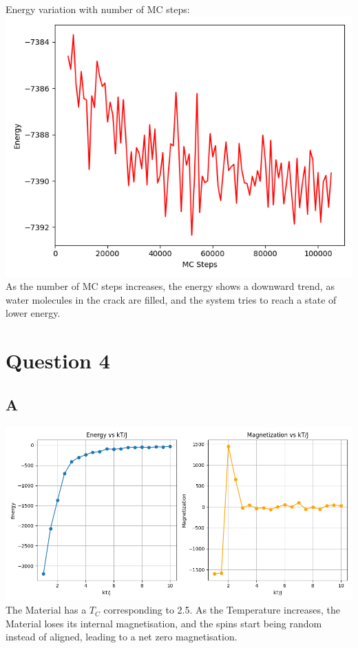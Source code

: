 \documentclass[11pt]{article}
\begin{document}
Energy variation with number of MC steps:\\
\includegraphics[scale=0.5]{Q3b_Crackfill_Energy_Plot.png}\\
As the number of MC steps increases, the energy shows a downward trend, as water molecules in the crack are filled, and the system tries to reach a state of lower energy.

\section{Question 4}
\subsection{A}
\includegraphics[scale=0.5]{Q4a_EMPlots.png}\\
The Material has a $T_C$ corresponding to 2.5. As the Temperature increases, the Material loses its internal magnetisation, and the spins start being random instead of aligned, leading to a net zero magnetisation.
\end{document}
